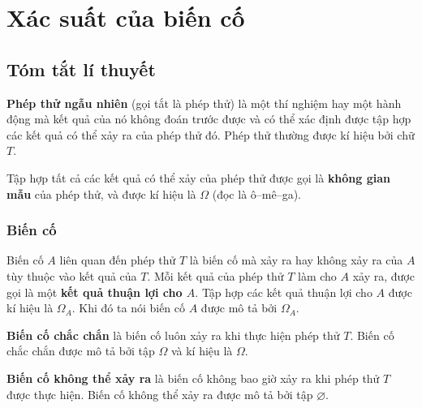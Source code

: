 \section{Xác suất của biến cố}
\subsection{Tóm tắt lí thuyết}
\begin{dn}
	\textbf{Phép thử ngẫu nhiên} (gọi tắt là phép thử) là một thí nghiệm hay một hành động mà kết quả của nó không đoán trước được và có thể xác định được tập hợp các kết quả có thể xảy ra của phép thử đó. Phép thử thường được kí hiệu bởi chữ $T$. 
	
\end{dn}

\begin{dn}
	Tập hợp tất cả các kết quả có thể xảy của phép thử được gọi là \textbf{không gian mẫu} của phép thử, và được kí hiệu là $\Omega$ (đọc là ô--mê--ga).
\end{dn}

\subsubsection{Biến cố}
\begin{dn}
	Biến cố $A$ liên quan đến phép thử $T$ là biến cố mà xảy ra hay không xảy ra của $A$ tùy thuộc vào kết quả của $T$. Mỗi kết quả của phép thử $T$ làm cho $A$ xảy ra, được gọi là một \textbf{kết quả thuận lợi cho $A$}. Tập hợp các kết quả thuận lợi cho $A$ được kí hiệu là $\Omega_A$. Khi đó ta nói biến cố $A$ được mô tả bởi $\Omega_A$.
	
\end{dn}

\begin{dn}
	\textbf{Biến cố chắc chắn} là biến cố luôn xảy ra khi thực hiện phép thử $T$. Biến cố chắc chắn được mô tả bởi tập $\Omega$ và kí hiệu là $\Omega$.
\end{dn}

\begin{dn}
	\textbf{Biến cố không thể xảy ra} là biến cố không bao giờ xảy ra khi phép thử $T$ được thực hiện. Biến cố không thể xảy ra được mô tả bởi tập $\varnothing$.
	
\end{dn}
